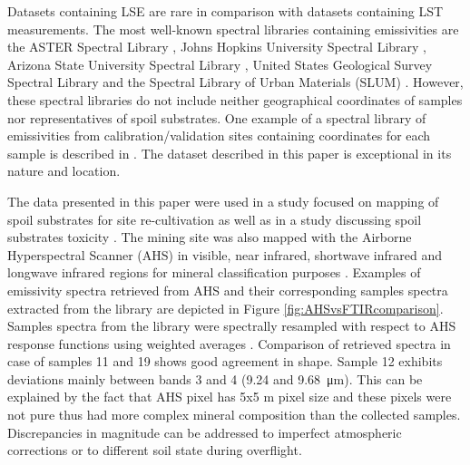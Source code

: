 \begin{appendices}
Datasets containing LSE are rare in comparison with datasets containing LST measurements. The most well-known spectral libraries containing emissivities are the ASTER Spectral Library \cite{BH09}, Johns Hopkins University Spectral Library \cite{SW91}, Arizona State University Spectral Library \cite{CB00}, United States Geological Survey Spectral Library \cite{CS16} and the Spectral Library of Urban Materials (SLUM) \cite{KS14}. However, these spectral libraries do not include neither geographical coordinates of samples nor representatives of spoil substrates. One example of a spectral library of emissivities from calibration/validation sites containing coordinates for each sample is described in \cite{SM09}. The dataset described in this paper is exceptional in its nature and location. 

The data presented in this paper were used in a study focused on mapping of spoil substrates for site re-cultivation \cite{Z14} as well as in a study discussing spoil substrates toxicity \cite{FK05}. The mining site was also mapped with the Airborne Hyperspectral Scanner (AHS) in visible, near infrared, shortwave infrared and longwave infrared regions for mineral classification purposes \cite{NK14}. Examples of emissivity spectra retrieved from AHS and their corresponding samples spectra extracted from the library are depicted in Figure \ref{fig:AHSvsFTIRcomparison}. Samples spectra from the library were spectrally resampled with respect to AHS response functions using weighted averages \cite{LT13}. Comparison of retrieved spectra in case of samples 11 and 19 shows good agreement in shape. Sample 12 exhibits deviations mainly between bands 3 and 4 (9.24 and \SI{9.68}{\micro\meter}). This can be explained by the fact that AHS pixel has 5x5 m pixel size and these pixels were not pure thus had more complex mineral composition than the collected samples. Discrepancies in magnitude can be addressed to imperfect atmospheric corrections or to different soil state during overflight.


\end{appendices}

